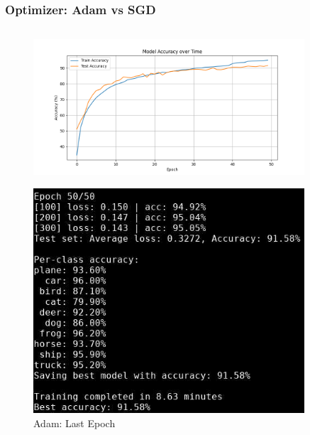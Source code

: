 \begin{frame}
\frametitle{Optimizer: Adam vs SGD}
\begin{columns}
    \begin{column}{0.5\textwidth}
        \begin{figure}[t]
            \centering
            \vspace{-0.4cm}
            \includegraphics[width=0.9\textwidth]{media/1stAssignment/cifar10_cnn_accuracy.png}
        \end{figure}
        \vspace{-0.8cm}
        \begin{figure}[t]
            \centering
            \includegraphics[width=0.9\textwidth]{media/1stAssignment/cnn_epoch_50.png}
            \vspace{-0.3cm}
            \caption{Adam: Last Epoch}
        \end{figure}
    \end{column}


\end{columns}
\end{frame}
